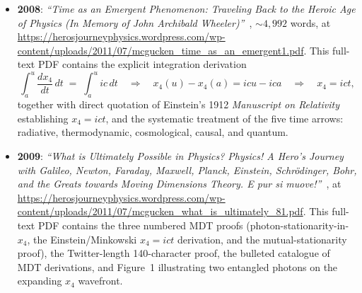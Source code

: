 \documentclass[11pt,a4paper]{article}
\begin{document}
\begin{itemize}
\item \textbf{2008}: \emph{``Time as an Emergent Phenomenon: Traveling Back to the Heroic Age of Physics (In Memory of John Archibald Wheeler)''}~\cite{mcguckentimepdf2008}, ${\sim}4{,}992$ words, at \url{https://herosjourneyphysics.wordpress.com/wp-content/uploads/2011/07/mcgucken_time_as_an_emergent1.pdf}. This full-text PDF contains the explicit integration derivation
\[
\int_a^u \frac{dx_4}{dt}\,dt \;=\; \int_a^u ic\,dt \quad\Rightarrow\quad x_4(u) - x_4(a) = icu - ica \quad\Rightarrow\quad x_4 = ict,
\]
together with direct quotation of Einstein's 1912 \emph{Manuscript on Relativity} establishing $x_4 = ict$, and the systematic treatment of the five time arrows: radiative, thermodynamic, cosmological, causal, and quantum.

\item \textbf{2009}: \emph{``What is Ultimately Possible in Physics? Physics! A Hero's Journey with Galileo, Newton, Faraday, Maxwell, Planck, Einstein, Schr\"odinger, Bohr, and the Greats towards Moving Dimensions Theory. E pur si muove!''}~\cite{mcguckenultimatelypdf2009}, at \url{https://herosjourneyphysics.wordpress.com/wp-content/uploads/2011/07/mcgucken_what_is_ultimately_81.pdf}. This full-text PDF contains the three numbered MDT proofs (photon-stationarity-in-$x_4$, the Einstein/Minkowski $x_4 = ict$ derivation, and the mutual-stationarity proof), the Twitter-length 140-character proof, the bulleted catalogue of MDT derivations, and Figure~1 illustrating two entangled photons on the expanding $x_4$ wavefront.


\end{itemize}
\end{document}
